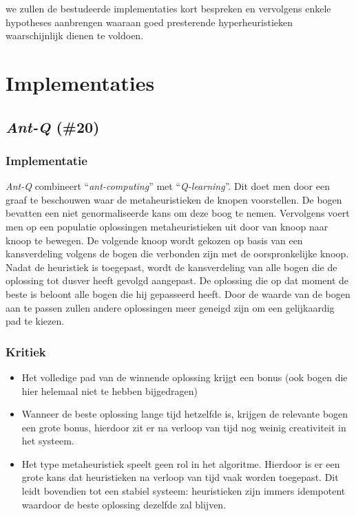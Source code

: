 we zullen de bestudeerde implementaties kort bespreken en vervolgens enkele hypotheses aanbrengen waaraan goed presterende hyperheuristieken waarschijnlijk dienen te voldoen.

\section{Implementaties}

\subsection{\emph{Ant-Q} (\#20)}
\label{sss:ant-q}
\subsubsection{Implementatie}
\emph{Ant-Q}\cite{chesc-ant-q,sis/ant-q} combineert ``\emph{ant-computing}''\cite{Michael:2009:AC:1596832.1596835} met ``\emph{Q-learning}''\cite{citeulike:5925674}. Dit doet men door een graaf te beschouwen waar de metaheuristieken de knopen voorstellen. De bogen bevatten een niet genormaliseerde kans om deze boog te nemen. Vervolgens voert men op een populatie oplossingen metaheuristieken uit door van knoop naar knoop te bewegen. De volgende knoop wordt gekozen op basis van een kansverdeling volgens de bogen die verbonden zijn met de oorspronkelijke knoop. Nadat de heuristiek is toegepast, wordt de kansverdeling van alle bogen die de oplossing tot dusver heeft gevolgd aangepast. De oplossing die op dat moment de beste is beloont alle bogen die hij gepasseerd heeft. Door de waarde van de bogen aan te passen zullen andere oplossingen meer geneigd zijn om een gelijkaardig pad te kiezen.
\subsubsection{Kritiek}
\begin{itemize}
 \item Het volledige pad van de winnende oplossing krijgt een bonus (ook bogen die hier helemaal niet te hebben bijgedragen)
 \item Wanneer de beste oplossing lange tijd hetzelfde is, krijgen de relevante bogen een grote bonus, hierdoor zit er na verloop van tijd nog weinig creativiteit in het systeem.
 \item Het type metaheuristiek speelt geen rol in het algoritme. Hierdoor is er een grote kans dat \abls{} heuristieken na verloop van tijd vaak worden toegepast. Dit leidt bovendien tot een stabiel systeem: \abls{} heuristieken zijn immers idempotent waardoor de beste oplossing dezelfde zal blijven.
\end{itemize}
